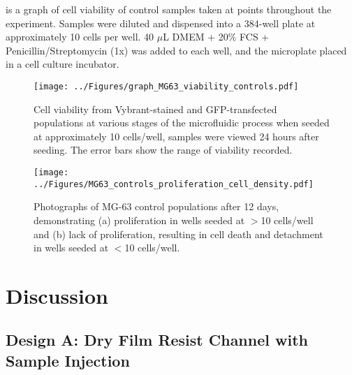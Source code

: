  is a graph of cell viability of control samples taken at points throughout the experiment. Samples were diluted and dispensed into a 384-well plate at approximately 10 cells per well. 40 $\mu$L DMEM + 20\% FCS + Penicillin/Streptomycin (1x) was added to each well, and the microplate placed in a cell culture incubator. 

\begin{figure}
	\centering
		\texttt{[image: ../Figures/graph\_MG63\_viability\_controls.pdf]}
	\caption[Cell viability of Vybrant-stained and GFP-transfected populations.]{Cell viability from Vybrant-stained and GFP-transfected populations at various stages of the microfluidic process when seeded at approximately 10 cells/well, samples were viewed 24 hours after seeding. The error bars show the range of viability recorded.}
	\label{fig:graph_MG63_viability_controls}
\end{figure}

\begin{figure}
	\centering
		\texttt{[image: ../Figures/MG63\_controls\_proliferation\_cell\_density.pdf]}
	\caption[Photographs of MG-63 control populations.]{Photographs of MG-63 control populations after 12 days, demonstrating (a) proliferation in wells seeded at $>$10 cells/well and (b) lack of proliferation, resulting in cell death and detachment in wells seeded at $<$10 cells/well.}
	\label{fig:MG63_controls_proliferation_cell_density}
\end{figure}

\section{Discussion}

\subsection{Design A: Dry Film Resist Channel with Sample Injection}

